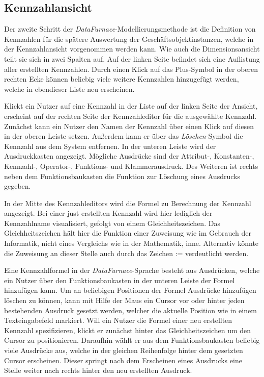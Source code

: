 \documentclass[
  language=german, %
  type=bachelor,%
  ngerman
]{isthesis}
\begin{document}
\begin{content}
  \subsection{Kennzahlansicht}

  Der zweite Schritt der \textit{DataFurnace}-Modellierungsmethode ist die
  Definition von Kennzahlen für die spätere Auswertung der
  Geschäftsobjektinstanzen, welche in der Kennzahlansicht vorgenommen werden
  kann. Wie auch die Dimensionsansicht teilt sie sich in zwei Spalten auf. Auf
  der linken Seite befindet sich eine Auflistung aller erstellten Kennzahlen.
  Durch einen Klick auf das Plus-Symbol in der oberen rechten Ecke können
  beliebig viele weitere Kennzahlen hinzugefügt werden, welche in ebendieser
  Liste neu erscheinen.

  Klickt ein Nutzer auf eine Kennzahl in der Liste auf der linken Seite der
  Ansicht, erscheint auf der rechten Seite der Kennzahleditor für die
  ausgewählte Kennzahl. Zunächst kann ein Nutzer den Namen der Kennzahl über
  einen Klick auf diesen in der oberen Leiste setzen. Außerdem kann er über das
  \textit{Löschen}-Symbol die Kennzahl aus dem System entfernen. In der unteren
  Leiste wird der Ausdruckkasten angezeigt. Mögliche Ausdrücke sind der
  \mbox{Attribut-,} \mbox{Konstanten-,} \mbox{Kennzahl-,} \mbox{Operator-,}
  Funktions- und Klammerausdruck.  Des Weiteren ist rechts neben dem
  Funktionsbaukasten die Funktion zur Löschung eines Ausdrucks gegeben.

  In der Mitte des Kennzahleditors wird die Formel zu Berechnung der Kennzahl
  angezeigt. Bei einer just erstellten Kennzahl wird hier lediglich der
  Kennzahlname visualisiert, gefolgt von einem Gleichheitszeichen. Das
  Gleichheitszeichen hält hier die Funktion einer Zuweisung wie im Gebrauch
  der Informatik, nicht eines Vergleichs wie in der Mathematik, inne.
  Alternativ könnte die Zuweisung an dieser Stelle auch durch das Zeichen
  \mbox{:=} verdeutlicht werden. 
  
  Eine Kennzahlformel in der \textit{DataFurnace}-Sprache besteht aus
  Ausdrücken, welche ein Nutzer über den Funktionsbaukasten in der unteren
  Leiste der Formel hinzufügen kann. Um an beliebigen Positionen der Formel
  Ausdrücke hinzufügen \bzw{} löschen zu können, kann mit Hilfe der Maus ein
  Cursor vor oder hinter jeden bestehenden Ausdruck gesetzt werden, welcher die
  aktuelle Position wie in einem Texteingabefeld markiert. Will ein Nutzer die
  Formel einer neu erstellten Kennzahl spezifizieren, klickt er zunächst hinter
  das Gleichheitszeichen um den Cursor zu positionieren.  Daraufhin wählt er
  aus dem Funktionsbaukasten beliebig viele Ausdrücke aus, welche in der
  gleichen Reihenfolge hinter dem gesetzten Cursor erscheinen.  Dieser springt
  nach dem Erscheinen eines Ausdrucks eine Stelle weiter nach rechts hinter den
  neu erstellten Ausdruck. 


\end{content}
\end{document}
